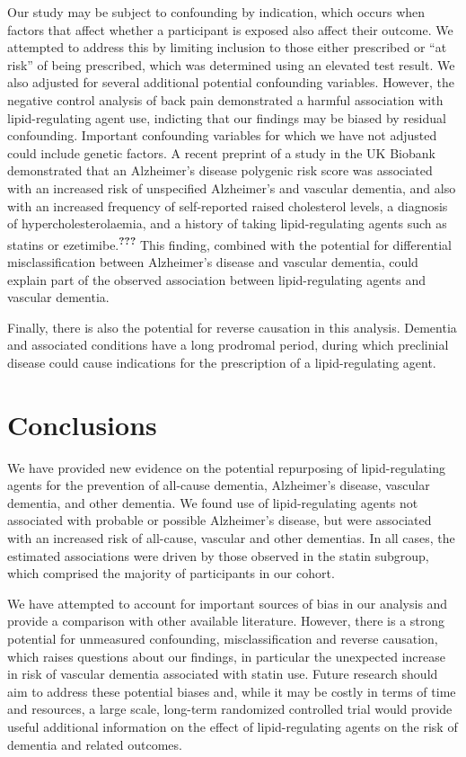 \documentclass[a4paper, twoside]{templates/ociamthesis}
\begin{document}
Our study may be subject to confounding by indication, which occurs when factors that affect whether a participant is exposed also affect their outcome. We attempted to address this by limiting inclusion to those either prescribed or ``at risk'' of being prescribed, which was determined using an elevated test result. We also adjusted for several additional potential confounding variables. However, the negative control analysis of back pain demonstrated a harmful association with lipid-regulating agent use, indicting that our findings may be biased by residual confounding. Important confounding variables for which we have not adjusted could include genetic factors. A recent preprint of a study in the UK Biobank demonstrated that an Alzheimer's disease polygenic risk score was associated with an increased risk of unspecified Alzheimer's and vascular dementia, and also with an increased frequency of self-reported raised cholesterol levels, a diagnosis of hypercholesterolaemia, and a history of taking lipid-regulating agents such as statins or ezetimibe.\textsuperscript{{\textbf{???}}} This finding, combined with the potential for differential misclassification between Alzheimer's disease and vascular dementia, could explain part of the observed association between lipid-regulating agents and vascular dementia.

Finally, there is also the potential for reverse causation in this analysis. Dementia and associated conditions have a long prodromal period, during which preclinial disease could cause indications for the prescription of a lipid-regulating agent.

\hypertarget{conclusions}{%
\section{Conclusions}\label{conclusions}}

We have provided new evidence on the potential repurposing of lipid-regulating agents for the prevention of all-cause dementia, Alzheimer's disease, vascular dementia, and other dementia. We found use of lipid-regulating agents not associated with probable or possible Alzheimer's disease, but were associated with an increased risk of all-cause, vascular and other dementias. In all cases, the estimated associations were driven by those observed in the statin subgroup, which comprised the majority of participants in our cohort.

We have attempted to account for important sources of bias in our analysis and provide a comparison with other available literature. However, there is a strong potential for unmeasured confounding, misclassification and reverse causation, which raises questions about our findings, in particular the unexpected increase in risk of vascular dementia associated with statin use. Future research should aim to address these potential biases and, while it may be costly in terms of time and resources, a large scale, long-term randomized controlled trial would provide useful additional information on the effect of lipid-regulating agents on the risk of dementia and related outcomes.
\end{document}
